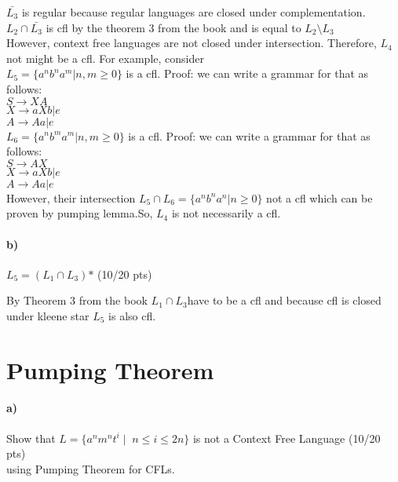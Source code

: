 \documentclass[a4paper,12pt]{article}
\begin{document}
\begin{tcolorbox}
 $\bar{L_3}$ is regular because regular languages are closed under complementation. \\
 $L_2 \cap \bar{L_3 }$ is cfl by the theorem 3 from the book and is equal to $L_2 \setminus L_3 $ \\
 However, context free languages are not closed under intersection. Therefore, $L_4$ not might be a cfl. For example, consider \\
 $L_5 = \{ a^n b^n a^m | n,m \geq 0 \} $ is a cfl. Proof: we can write a grammar for that as follows: \\
 $S \rightarrow XA$ \\
 $X \rightarrow aXb | e $ \\
 $A \rightarrow Aa | e $ \\
 $L_6 = \{ a^n b^m a^m | n,m \geq 0 \} $ is a cfl. Proof: we can write a grammar for that as follows: \\
 $S \rightarrow AX$ \\
 $X \rightarrow aXb | e $ \\
 $A \rightarrow Aa | e $ \\
 However, their intersection $L_5 \cap L_6 = \{ a^n b^n a^n | n \geq 0 \} $ not a cfl which can be proven by pumping lemma.So, $L_4$ is not necessarily a cfl. \\
 
\end{tcolorbox}

\paragraph{b)} $L_5 = (L_1 \cap L_3)\text{*}$ \hfill \small{(10/20 pts)} \\

\begin{tcolorbox}
By Theorem 3 from the book $L_{1} \cap L_{3} $have to be a cfl and because cfl is closed under kleene star $ L_{5}$ is also cfl.
\end{tcolorbox}





\newpage
\section{Pumping Theorem \hfill {}}

\paragraph{a)} Show that $L=\{a^n m^n t^i \mid \; n\leq i \leq 2n\}$ is not a Context Free Language \hfill \small{(10/20 pts)} \\
using Pumping Theorem for CFLs. \\
\end{document}
